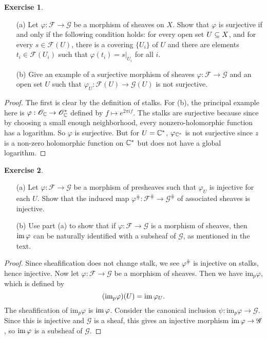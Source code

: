 \documentclass[11pt]{book}
\theoremstyle{definition}
\newtheorem{exercise}{Exercise}[section]
\begin{document}
\begin{exercise}
\mbox{}
\begin{itemize}
\item[(a)] Let $\varphi:\mathscr{F}\to\mathscr{G}$ be a morphism of sheaves on $X$. Show that $\varphi$ is surjective if and only if the following condition holds: for every open set $U\subseteq X$, and for every $s\in\mathscr{F}(U)$, there is a covering $\{U_i\}$ of $U$ and there are elements $t_i\in\mathscr{F}(U_i)$ such that $\varphi(t_i)=s|_{U_i}$ for all $i$.
\item[(b)] Give an example of a surjective morphism of sheaves $\varphi:\mathscr{F}\to\mathscr{G}$ and an open set $U$ such that $\varphi_U:\mathscr{F}(U)\to\mathscr{G}(U)$ is not surjective.
\end{itemize}
\end{exercise}
\begin{proof}
The first is clear by the definition of stalks. For (b), the principal example here is $\varphi:\mathscr{O}_{\mathbb{C}}\to\mathscr{O}_{\mathbb{C}}^*$ defined by $f\mapsto e^{2\pi if}$. The stalks are surjective because since by choosing a small enough neighborhood, every nonzero-holomorphic function has a logarithm. So $\varphi$ is surjective. But for $U=\mathbb{C}^*$, $\varphi_{\mathbb{C}^*}$ is not surjective since $z$ is a non-zero holomorphic function on $\mathbb{C}^*$ but does not have a global logarithm.
\end{proof}
\begin{exercise}
\mbox{}
\begin{itemize}
\item[(a)] Let $\varphi:\mathscr{F}\to\mathscr{G}$ be a morphism of presheaves such that $\varphi_U$ is injective for each $U$. Show that the induced map $\varphi^{\hash}:\mathscr{F}^{\hash}\to\mathscr{G}^{\hash}$ of associated sheaves is injective.
\item[(b)] Use part (a) to show that if $\varphi:\mathscr{F}\to\mathscr{G}$ is a morphism of sheaves, then $\mathrm{im}\,\varphi$ can be naturally identified with a subsheaf of $\mathscr{G}$, as mentioned in the text.
\end{itemize}
\end{exercise}
\begin{proof}
Since sheafification does not change stalk, we see $\varphi^{\hash}$ is injective on stalks, hence injective. Now let $\varphi:\mathscr{F}\to\mathscr{G}$ be a morphism of sheaves. Then we have $\mathrm{im}_p\varphi$, which is defined by
\[(\mathrm{im}_p\varphi)(U)=\mathrm{im}\,\varphi_U.\]
The sheafification of $\mathrm{im}_p\varphi$ is $\mathrm{im}\,\varphi$. Consider the canonical inclusion $\psi:\mathrm{im}_p\varphi\to\mathscr{G}$. Since this is injective and $\mathscr{G}$ is a sheaf, this gives an injective morphism $\mathrm{im}\,\varphi\to\mathscr{G}$, so $\mathrm{im}\,\varphi$ is a subsheaf of $\mathscr{G}$.
\end{proof}
\end{document}
